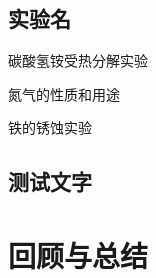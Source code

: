 \documentclass[color=orange]{textbook-cn}%
\begin{document}
\begin{Project}
\section{实验名}
\begin{Point}
\lipsum[2]
\end{Point}

\begin{Case}
\item 碳酸氢铵受热分解实验
\item 氮气的性质和用途
\item 铁的锈蚀实验
\end{Case}

\subsection{测试文字}
\lipsum
\begin{Definition}[定理名称]
\lipsum[1]
\end{Definition}

\begin{Lemma}[引理名称]
\lipsum[1]
\end{Lemma}
\end{Project}



\section{回顾与总结}
\begin{Point*}
\lipsum[1]
\end{Point*}

\begin{Case*}
\item \lipsum[1][1]
\item \lipsum[1][1]
\item \lipsum[1][1]
\item \lipsum[1][1]
\item \lipsum[1][1]
\item \lipsum[1][1]
\item \lipsum[1][1]
\end{Case*}
\end{document}
